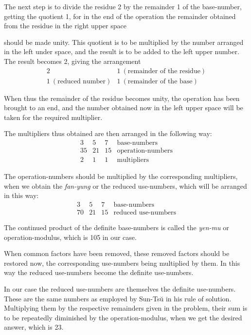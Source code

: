\documentclass[11pt]{article}
\newcommand{\scanpage}[2]{\clearpage\setcounter{footnote}{0}\noindent{\footnotesize\color{gray}PDF page #1 · #2}\par\medskip}
\newcommand{\scanfooter}{}
\begin{document}
The next step is to divide the residue 2 by the remainder 1 of the base-number, getting the quotient 1, for in the end of the operation the remainder obtained from the residue in the right upper space
\scanfooter

\scanpage{0081}{Chapter 11, printed page 67}
should be made unity. This quotient is to be multiplied by the number arranged in the left under space, and the result is to be added to the left upper number. The result becomes 2, giving the arrangement
\[
\begin{array}{l|l}
2&1\ (\text{remainder of the residue})\\ \hline
1\ (\text{reduced number})&1\ (\text{remainder of the base})
\end{array}
\]

When thus the remainder of the residue becomes unity, the operation has been brought to an end, and the number obtained now in the left upper space will be taken for the required multiplier.

The multipliers thus obtained are then arranged in the following way:
\[
\begin{array}{c|c|c|l}
3&5&7&\text{base-numbers}\\ \hline
35&21&15&\text{operation-numbers}\\ \hline
2&1&1&\text{multipliers}
\end{array}
\]

The operation-numbers should be multiplied by the corresponding multipliers, when we obtain the \emph{fan-yung} or the reduced use-numbers, which will be arranged in this way:
\[
\begin{array}{c|c|c|l}
3&5&7&\text{base-numbers}\\ \hline
70&21&15&\text{reduced use-numbers}
\end{array}
\]

The continued product of the definite base-numbers is called the \emph{yen-mu} or operation-modulus, which is 105 in our case.

When common factors have been removed, these removed factors should be restored now, the corresponding use-numbers being multiplied by them. In this way the reduced use-numbers become the definite use-numbers.

In our case the reduced use-numbers are themselves the definite use-numbers. These are the same numbers as employed by Sun-Tsŭ in his rule of solution. Multiplying them by the respective remainders given in the problem, their sum is to be repeatedly diminished by the operation-modulus, when we get the desired answer, which is 23.
\end{document}
